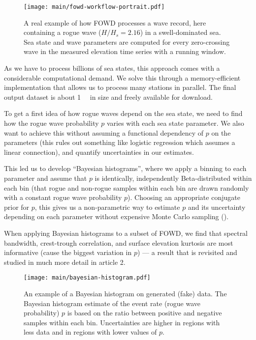 \begin{figure}
    \strictpagechecktrue
    \begin{whole}
        \vspace*{-2.2cm}
        \texttt{[image: main/fowd-workflow-portrait.pdf]}
    \end{whole}
    \caption{A real example of how FOWD processes a wave record, here containing a rogue wave ($H/H_s = 2.16$) in a swell-dominated sea. Sea state and wave parameters are computed for every zero-crossing wave in the measured elevation time series with a running window.} \label{fig:fowd-workflow}
\end{figure}

As we have to process billions of sea states, this approach comes with a considerable computational demand. We solve this through a memory-efficient implementation that allows us to process many stations in parallel. The final output dataset is about \SI{1}{\tera\byte} in size and freely available for download.

To get a first idea of how rogue waves depend on the sea state, we need to find how the rogue wave probability $p$ varies with each sea state parameter. We also want to achieve this without assuming a functional dependency of $p$ on the parameters (this rules out something like logistic regression which assumes a linear connection), and quantify uncertainties in our estimates.

This led us to develop \enquote{Bayesian histograms}, where we apply a binning to each parameter and assume that $p$ is identically, independently Beta-distributed within each bin (\ie that rogue and non-rogue samples within each bin are drawn randomly with a constant rogue wave probability $p$). Choosing an appropriate conjugate prior for $p$, this gives us a non-parametric way to estimate $p$ and its uncertainty depending on each parameter without expensive Monte Carlo sampling ().

When applying Bayesian histograms to a subset of FOWD, we find that spectral bandwidth, crest-trough correlation, and surface elevation kurtosis are most informative (cause the biggest variation in $p$) --- a result that is revisited and studied in much more detail in article 2.

\begin{figure}[b]
    \caption{An example of a Bayesian histogram on generated (fake) data. The Bayesian histogram estimate of the event rate (rogue wave probability) $p$ is based on the ratio between positive and negative samples within each bin. Uncertainties are higher in regions with less data and in regions with lower values of $p$.} \label{fig:bayeshist}
    \strictpagechecktrue
    \begin{whole}
    \texttt{[image: main/bayesian-histogram.pdf]}
    \end{whole}
\end{figure}

